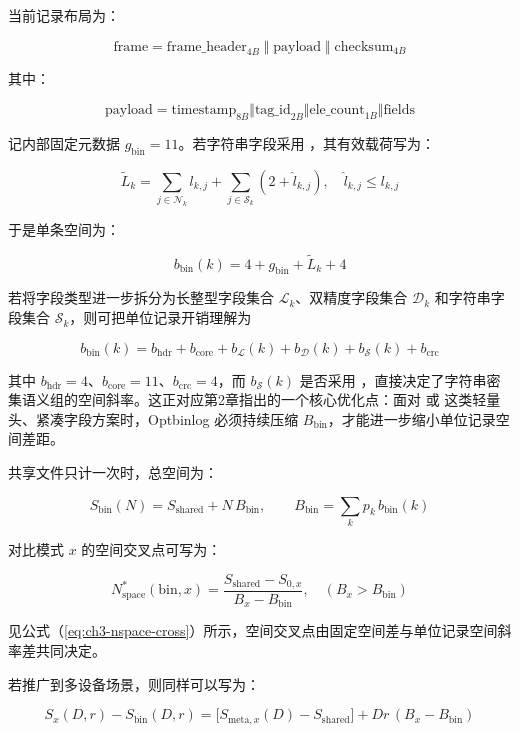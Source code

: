 当前记录布局为：

\[
\mathrm{frame}=\mathrm{frame\_header}_{4B}\;\Vert\;\mathrm{payload}\;\Vert\;\mathrm{checksum}_{4B}
\]

其中：

\[
\mathrm{payload}=\mathrm{timestamp}_{8B}\Vert\mathrm{tag\_id}_{2B}\Vert\mathrm{ele\_count}_{1B}\Vert\mathrm{fields}
\]

记内部固定元数据 \(g_{\text{bin}}=11\)。若字符串字段采用 ，其有效载荷写为：

\[
\widetilde{L}_k=
\sum_{j\in\mathcal{N}_k}l_{k,j}+\sum_{j\in\mathcal{S}_k}(2+\hat l_{k,j}),\quad \hat l_{k,j}\le l_{k,j}
\]

于是单条空间为：

\[
b_{\text{bin}}(k)=4+g_{\text{bin}}+\widetilde{L}_k+4
\]

若将字段类型进一步拆分为长整型字段集合 \(\mathcal{L}_k\)、双精度字段集合 \(\mathcal{D}_k\) 和字符串字段集合 \(\mathcal{S}_k\)，则可把单位记录开销理解为

\[
b_{\text{bin}}(k)=b_{\text{hdr}}+b_{\text{core}}+b_{\mathcal{L}}(k)+b_{\mathcal{D}}(k)+b_{\mathcal{S}}(k)+b_{\text{crc}}
\]

其中 \(b_{\text{hdr}}=4\)、\(b_{\text{core}}=11\)、\(b_{\text{crc}}=4\)，而 \(b_{\mathcal{S}}(k)\) 是否采用 ，直接决定了字符串密集语义组的空间斜率。这正对应第2章指出的一个核心优化点：面对  或  这类轻量头、紧凑字段方案时，Optbinlog 必须持续压缩 \(B_{\text{bin}}\)，才能进一步缩小单位记录空间差距。

共享文件只计一次时，总空间为：

\begin{equation}
S_{\text{bin}}(N)=S_{\text{shared}}+N\,B_{\text{bin}},\qquad
B_{\text{bin}}=\sum_k p_k\,b_{\text{bin}}(k)
\label{eq:ch3-sbin-n}
\end{equation}

对比模式 \(x\) 的空间交叉点可写为：

\begin{equation}
N_{\text{space}}^*(\text{bin},x)=\frac{S_{\text{shared}}-S_{0,x}}{B_x-B_{\text{bin}}},\quad(B_x>B_{\text{bin}})
\label{eq:ch3-nspace-cross}
\end{equation}

见公式（\ref{eq:ch3-nspace-cross}）所示，空间交叉点由固定空间差与单位记录空间斜率差共同决定。

若推广到多设备场景，则同样可以写为：

\[
S_x(D,r)-S_{\text{bin}}(D,r)=\bigl[S_{\text{meta},x}(D)-S_{\text{shared}}\bigr]+Dr\,(B_x-B_{\text{bin}})
\]


